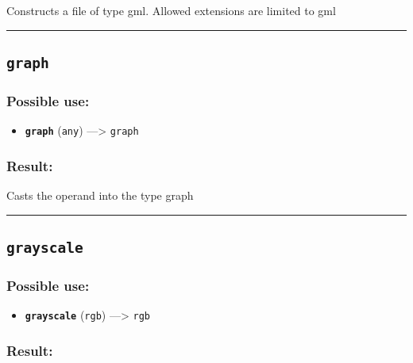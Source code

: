 \documentclass[]{book}
\providecommand{\tightlist}{%
  \setlength{\itemsep}{0pt}\setlength{\parskip}{0pt}}
\theoremstyle{definition}
\theoremstyle{definition}
\theoremstyle{definition}
\theoremstyle{remark}
\begin{document}
Constructs a file of type gml. Allowed extensions are limited to gml

\begin{center}\rule{0.5\linewidth}{\linethickness}\end{center}

\subsection{\texorpdfstring{\texttt{graph}}{graph}}\label{graph}

\subsubsection{Possible use:}\label{possible-use-239}

\begin{itemize}
\tightlist
\item
  \textbf{\texttt{graph}} (\texttt{any}) ---\textgreater{}
  \texttt{graph}
\end{itemize}

\subsubsection{Result:}\label{result-230}

Casts the operand into the type graph

\begin{center}\rule{0.5\linewidth}{\linethickness}\end{center}

\subsection{\texorpdfstring{\texttt{grayscale}}{grayscale}}\label{grayscale}

\subsubsection{Possible use:}\label{possible-use-240}

\begin{itemize}
\tightlist
\item
  \textbf{\texttt{grayscale}} (\texttt{rgb}) ---\textgreater{}
  \texttt{rgb}
\end{itemize}

\subsubsection{Result:}\label{result-231}
\end{document}
